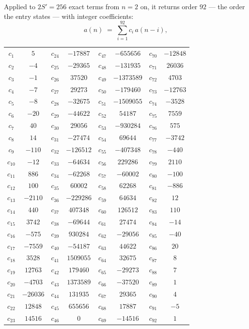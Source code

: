 \documentclass[11pt,a4paper]{article}
\theoremstyle{plain}
\theoremstyle{definition}
\begin{document}
Applied to $2S'=256$ exact terms from $n=2$ on, it returns order $92$ --- the
order the entry states --- with integer coefficients:
\[
a(n)\;=\;\sum_{i=1}^{92}c_i\,a(n-i),
\]
\begin{center}\small
\begin{tabular}{cccccccc}
$c_{1}$ & $5$ & $c_{24}$ & $-17887$ & $c_{47}$ & $-655656$ & $c_{70}$ & $-12848$ \\
$c_{2}$ & $-4$ & $c_{25}$ & $-29365$ & $c_{48}$ & $-131935$ & $c_{71}$ & $26036$ \\
$c_{3}$ & $-1$ & $c_{26}$ & $37520$ & $c_{49}$ & $-1373589$ & $c_{72}$ & $4703$ \\
$c_{4}$ & $-7$ & $c_{27}$ & $29273$ & $c_{50}$ & $-179460$ & $c_{73}$ & $-12763$ \\
$c_{5}$ & $-8$ & $c_{28}$ & $-32675$ & $c_{51}$ & $-1509055$ & $c_{74}$ & $-3528$ \\
$c_{6}$ & $-20$ & $c_{29}$ & $-44622$ & $c_{52}$ & $54187$ & $c_{75}$ & $7559$ \\
$c_{7}$ & $40$ & $c_{30}$ & $29056$ & $c_{53}$ & $-930284$ & $c_{76}$ & $575$ \\
$c_{8}$ & $14$ & $c_{31}$ & $-27474$ & $c_{54}$ & $69644$ & $c_{77}$ & $-3742$ \\
$c_{9}$ & $-110$ & $c_{32}$ & $-126512$ & $c_{55}$ & $-407348$ & $c_{78}$ & $-440$ \\
$c_{10}$ & $-12$ & $c_{33}$ & $-64634$ & $c_{56}$ & $229286$ & $c_{79}$ & $2110$ \\
$c_{11}$ & $886$ & $c_{34}$ & $-62268$ & $c_{57}$ & $-60002$ & $c_{80}$ & $-100$ \\
$c_{12}$ & $100$ & $c_{35}$ & $60002$ & $c_{58}$ & $62268$ & $c_{81}$ & $-886$ \\
$c_{13}$ & $-2110$ & $c_{36}$ & $-229286$ & $c_{59}$ & $64634$ & $c_{82}$ & $12$ \\
$c_{14}$ & $440$ & $c_{37}$ & $407348$ & $c_{60}$ & $126512$ & $c_{83}$ & $110$ \\
$c_{15}$ & $3742$ & $c_{38}$ & $-69644$ & $c_{61}$ & $27474$ & $c_{84}$ & $-14$ \\
$c_{16}$ & $-575$ & $c_{39}$ & $930284$ & $c_{62}$ & $-29056$ & $c_{85}$ & $-40$ \\
$c_{17}$ & $-7559$ & $c_{40}$ & $-54187$ & $c_{63}$ & $44622$ & $c_{86}$ & $20$ \\
$c_{18}$ & $3528$ & $c_{41}$ & $1509055$ & $c_{64}$ & $32675$ & $c_{87}$ & $8$ \\
$c_{19}$ & $12763$ & $c_{42}$ & $179460$ & $c_{65}$ & $-29273$ & $c_{88}$ & $7$ \\
$c_{20}$ & $-4703$ & $c_{43}$ & $1373589$ & $c_{66}$ & $-37520$ & $c_{89}$ & $1$ \\
$c_{21}$ & $-26036$ & $c_{44}$ & $131935$ & $c_{67}$ & $29365$ & $c_{90}$ & $4$ \\
$c_{22}$ & $12848$ & $c_{45}$ & $655656$ & $c_{68}$ & $17887$ & $c_{91}$ & $-5$ \\
$c_{23}$ & $14516$ & $c_{46}$ & $0$ & $c_{69}$ & $-14516$ & $c_{92}$ & $1$ \\
\end{tabular}
\end{center}
\end{document}

